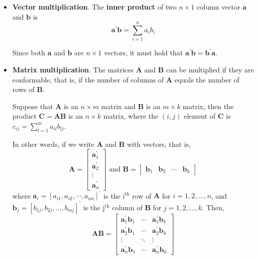 \documentclass[a4paper,11pt]{article}
\begin{document}
\begin{itemize}
\item \textbf{Vector multiplication}. The \textbf{inner product} of two \(n \times 1\)
column vector \(\mathbf{a}\) and \(\mathbf{b}\) is
\[ \mathbf{a}^{\prime} \mathbf{b} = \sum^n_{i=1} a_i b_i \]

Since both \(\mathbf{a}\) and \(\mathbf{b}\) are \(n \times 1\) vectors,
it must hold that \(\mathbf{a}^{\prime} \mathbf{b} =
  \mathbf{b}^{\prime} \mathbf{a}\).

\item \textbf{Matrix multiplication}. The matrices \(\mathbf{A}\) and \(\mathbf{B}\)
can be multiplied if they are conformable, that is, if the number of
columns of \(\mathbf{A}\) equals the number of rows of \(\mathbf{B}\). 

Suppose that \(\mathbf{A}\) is an \(n \times m\) matrix and
\(\mathbf{B}\) is an \(m \times k\) matrix, then the product
\(\mathbf{C} = \mathbf{AB}\) is an \(n \times k\) matrix, where the
\((i,j)\) element of \(\mathbf{C}\) is \(c_{ij} = \sum_{l=1}^m a_{il}
  b_{lj}\). 

In other words, if we write \(\mathbf{A}\) and \(\mathbf{B}\) with
vectors, that is,
\begin{equation*}
\mathbf{A} = 
\begin{bmatrix}
\mathbf{a}_1^{\prime} \\ \mathbf{a}_2^{\prime} \\ \vdots \\ \mathbf{a}_{n}^{\prime}
\end{bmatrix}
\text{ and }
\mathbf{B} = 
\begin{bmatrix}
\mathbf{b}_1 & \mathbf{b}_2 & \cdots & \mathbf{b}_k
\end{bmatrix}
\end{equation*}
where \(\mathbf{a}_i = [a_{i1}, a_{i2}, \cdots, a_{im}]^{\prime}\) is the i\(^{\text{th}}\)
row of \(\mathbf{A}\) for \(i = 1, 2, \ldots, n\), and \(\mathbf{b}_j =
  [b_{1j}, b_{2j}, \ldots, b_{mj}]^{\prime}\) is the j\(^{\text{th}}\) column of
\(\mathbf{B}\) for \(j = 1, 2, \ldots, k\). Then,
\begin{equation*}
\mathbf{AB} = 
\begin{bmatrix}
\mathbf{a}_1^{\prime} \mathbf{b}_1 & \cdots & \mathbf{a}_1^{\prime} \mathbf{b}_k \\
\mathbf{a}_2^{\prime} \mathbf{b}_1 & \cdots & \mathbf{a}_2^{\prime} \mathbf{b}_k \\
\vdots & \ddots & \vdots \\
\mathbf{a}_n^{\prime} \mathbf{b}_1 & \cdots & \mathbf{a}_n^{\prime} \mathbf{b}_k
\end{bmatrix}
\end{equation*}
\end{itemize}
\end{document}
